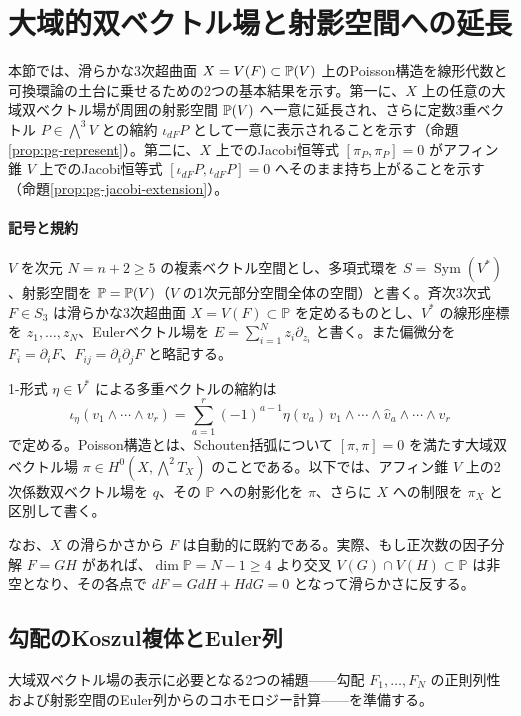 \section{大域的双ベクトル場と射影空間への延長}\label{sec:pg-extension}

本節では、滑らかな3次超曲面 $X=V(F)\subset\mathbb P(V)$ 上のPoisson構造を線形代数と可換環論の土台に乗せるための2つの基本結果を示す。第一に、$X$ 上の任意の大域双ベクトル場が周囲の射影空間 $\mathbb P(V)$ へ一意に延長され、さらに定数3重ベクトル $P\in\bigwedge^3V$ との縮約 $\iota_{dF}P$ として一意に表示されることを示す（命題\ref{prop:pg-represent}）。第二に、$X$ 上でのJacobi恒等式 $[\pi_P,\pi_P]=0$ がアフィン錐 $V$ 上でのJacobi恒等式 $[\iota_{dF}P,\iota_{dF}P]=0$ へそのまま持ち上がることを示す（命題\ref{prop:pg-jacobi-extension}）。

\paragraph{記号と規約}
$V$ を次元 $N=n+2\ge5$ の複素ベクトル空間とし、多項式環を $S=\operatorname{Sym}(V^*)$、射影空間を $\mathbb P=\mathbb P(V)$（$V$ の1次元部分空間全体の空間）と書く。斉次3次式 $F\in S_3$ は滑らかな3次超曲面 $X=V(F)\subset\mathbb P$ を定めるものとし、$V^*$ の線形座標を $z_1,\ldots,z_N$、Eulerベクトル場を $E=\sum_{i=1}^N z_i\partial_{z_i}$ と書く。また偏微分を $F_i=\partial_i F$、$F_{ij}=\partial_i\partial_j F$ と略記する。

1-形式 $\eta\in V^*$ による多重ベクトルの縮約は
\begin{equation}\label{eq:pg-contraction-convention}
\iota_\eta(v_1\wedge\cdots\wedge v_r)
=\sum_{a=1}^r(-1)^{a-1}\eta(v_a)\,
v_1\wedge\cdots\wedge\widehat v_a\wedge\cdots\wedge v_r
\end{equation}
で定める。Poisson構造とは、Schouten括弧について $[\pi,\pi]=0$ を満たす大域双ベクトル場 $\pi\in H^0(X,\bigwedge^2T_X)$ のことである。以下では、アフィン錐 $V$ 上の2次係数双ベクトル場を $q$、その $\mathbb P$ への射影化を $\pi$、さらに $X$ への制限を $\pi_X$ と区別して書く。

なお、$X$ の滑らかさから $F$ は自動的に既約である。実際、もし正次数の因子分解 $F=GH$ があれば、$\dim\mathbb P=N-1\ge4$ より交叉 $V(G)\cap V(H)\subset\mathbb P$ は非空となり、その各点で $dF=GdH+HdG=0$ となって滑らかさに反する。

\subsection{勾配のKoszul複体とEuler列}
大域双ベクトル場の表示に必要となる2つの補題——勾配 $F_1,\ldots,F_N$ の正則列性および射影空間のEuler列からのコホモロジー計算——を準備する。

